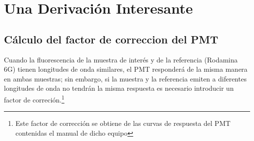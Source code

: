 \chapter[Ap\'endice A: Una Derivaci\'on Interesante]{Una Derivaci\'on Interesante}\label{app-thes}

\section{C\'alculo del factor de correccion del PMT}\label{apendicitis} 

Cuando la fluorescencia de la muestra de inter\'es y de la referencia (Rodamina 6G) tienen longitudes de onda similares, el PMT responder\'a de la misma manera en ambas muestras; sin embargo, si la muestra y la referencia emiten a diferentes longitudes de onda no tendr\'an la misma respuesta es necesario introducir un factor de correci\'on.\footnote{Este factor de correcci\'on se obtiene de las curvas de respuesta del PMT contenidas el manual de dicho equipo}
